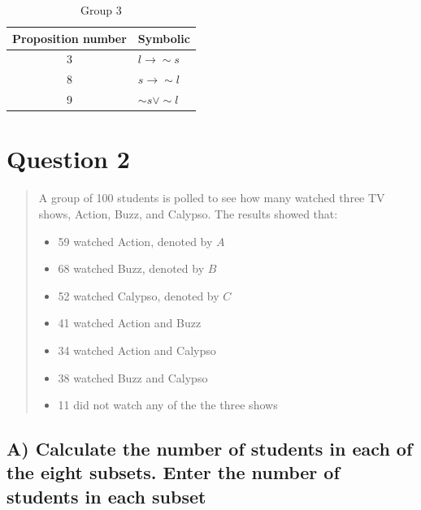 \documentclass[12pt,a4paper]{article}
\begin{document}
\begin{table}[h]
\centering
\caption{Group 3}
\begin{tabular}{c|l}
Proposition number & Symbolic \\
\hline
3 & $l \rightarrow \sim{s}$ \\
\hline
8 & $s \rightarrow \sim{l}$ \\
\hline
9 & $\sim{s} \vee \sim{l}$ \\
\hline
\end{tabular}
\end{table}

\newpage
\section{Question 2}
\begin{quote}
A group of 100 students is polled to see how many watched three TV shows, Action, Buzz, and Calypso. The results showed that:
\begin{itemize}
\item 59 watched Action, denoted by $A$
\item 68 watched Buzz, denoted by $B$
\item 52 watched Calypso, denoted by $C$
\item 41 watched Action and Buzz
\item 34 watched Action and Calypso
\item 38 watched Buzz and Calypso
\item 11 did not watch any of the the three shows 
\end{itemize}
\end{quote}

\subsection{A) Calculate the number of students in each of the eight subsets. Enter the number of students in each subset}
\end{document}
